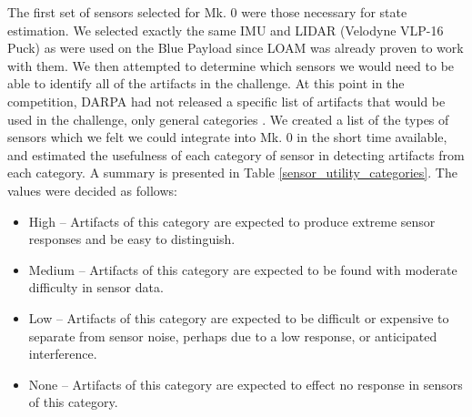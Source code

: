 The first set of sensors selected for Mk. 0 were those necessary for state estimation. We selected exactly the same IMU and LIDAR (Velodyne VLP-16 Puck) as were used on the Blue Payload since LOAM was already proven to work with them. We then attempted to determine which sensors we would need to be able to identify all of the artifacts in the challenge. At this point in the competition, DARPA had not released a specific list of artifacts that would be used in the challenge, only general categories \cite{tunnel_rules}. We created a list of the types of sensors which we felt we could integrate into Mk. 0 in the short time available, and estimated the usefulness of each category of sensor in detecting artifacts from each category. A summary is presented in Table \ref{sensor_utility_categories}. The values were decided as follows:

\begin{itemize}
	\item High -- Artifacts of this category are expected to produce extreme sensor responses and be easy to distinguish.
	\item Medium -- Artifacts of this category are expected to be found with moderate difficulty in sensor data.
	\item Low -- Artifacts of this category are expected to be difficult or expensive to separate from sensor noise, perhaps due to a low response, or anticipated interference.
	\item None -- Artifacts of this category are expected to effect no response in sensors of this category.
\end{itemize}


